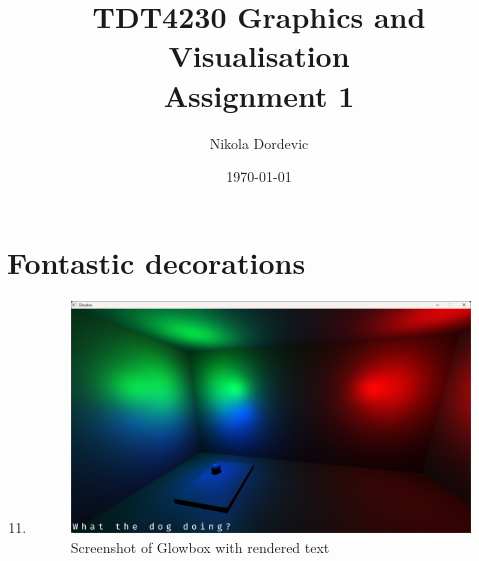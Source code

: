 \documentclass[11pt,a4paper]{report}
\title{TDT4230 Graphics and Visualisation \\ Assignment 1}
\author{Nikola Dordevic}
\date{\today}
\begin{document}
\maketitle
\section{Fontastic decorations}
\begin{enumerate}[label=(\alph*)]\setcounter{enumi}{10}
	\item \hfill
	
	\begin{figure}[h]
		\centering
		\includegraphics[width=\textwidth]{images/task1k.png}
		\caption{Screenshot of Glowbox with rendered text}
	\end{figure}
\end{enumerate}

\clearpage
\end{document}
